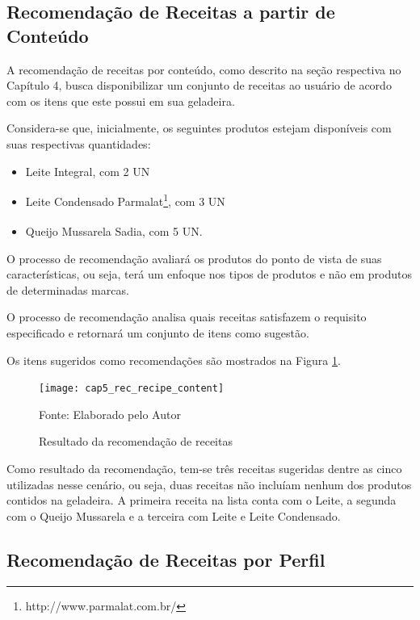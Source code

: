 \subsection{Recomendação de Receitas a partir de Conteúdo}

A recomendação de receitas por conteúdo, como descrito na seção respectiva no Capítulo 4, busca disponibilizar um conjunto de receitas ao usuário de acordo com os itens que este possui em sua geladeira. 

Considera-se que, inicialmente, os seguintes produtos estejam disponíveis com suas respectivas quantidades:

\begin{itemize}[noitemsep,topsep=5pt]
    \item Leite Integral, com 2 UN
    \item Leite Condensado Parmalat\textsuperscript{\textregistered}\footnote{http://www.parmalat.com.br/}, com 3 UN 
    \item Queijo Mussarela Sadia\textsuperscript{\textregistered}, com 5 UN.
\end{itemize}

O processo de recomendação avaliará os produtos do ponto de vista de suas características, ou seja, terá um enfoque nos tipos de produtos e não em produtos de determinadas marcas.

O processo de recomendação analisa quais receitas satisfazem o requisito especificado e retornará um conjunto de itens como sugestão.

Os itens sugeridos como recomendações são mostrados na Figura \ref{fig:cap5_rec_recipe_content}.

\begin{figure}[htb]
\caption{Resultado da recomendação de receitas}
\label{fig:cap5_rec_recipe_content}
\texttt{[image: cap5\_rec\_recipe\_content]}

\footnotesize{Fonte: Elaborado pelo Autor}
\end{figure}

Como resultado da recomendação, tem-se três receitas sugeridas dentre as cinco utilizadas nesse cenário, ou seja, duas receitas não incluíam nenhum dos produtos contidos na geladeira. A primeira receita na lista conta com o Leite, a segunda com o Queijo Mussarela e a terceira com Leite e Leite Condensado.

\subsection{Recomendação de Receitas por Perfil}

